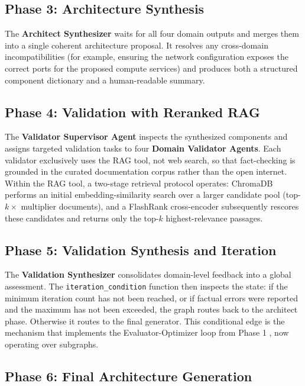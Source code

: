 \subsection{Phase 3: Architecture Synthesis}

The \textbf{Architect Synthesizer} waits for all four domain outputs and merges them into a single coherent architecture proposal. It resolves any cross-domain incompatibilities (for example, ensuring the network configuration exposes the correct ports for the proposed compute services) and produces both a structured component dictionary and a human-readable summary.

\subsection{Phase 4: Validation with Reranked RAG}

The \textbf{Validator Supervisor Agent} inspects the synthesized components and assigns targeted validation tasks to four \textbf{Domain Validator Agents}. Each validator exclusively uses the RAG tool, not web search, so that fact-checking is grounded in the curated documentation corpus rather than the open internet. Within the RAG tool, a two-stage retrieval protocol operates: ChromaDB performs an initial embedding-similarity search over a larger candidate pool (top-$k \times$ multiplier documents), and a FlashRank cross-encoder \cite{gao2023retrieval} subsequently rescores these candidates and returns only the top-$k$ highest-relevance passages.

\subsection{Phase 5: Validation Synthesis and Iteration}

The \textbf{Validation Synthesizer} consolidates domain-level feedback into a global assessment. The \texttt{iteration\_condition} function then inspects the state: if the minimum iteration count has not been reached, or if factual errors were reported and the maximum has not been exceeded, the graph routes back to the architect phase. Otherwise it routes to the final generator. This conditional edge is the mechanism that implements the Evaluator-Optimizer loop from Phase 1 \cite{anthropic2024agents}, now operating over subgraphs.

\subsection{Phase 6: Final Architecture Generation}

